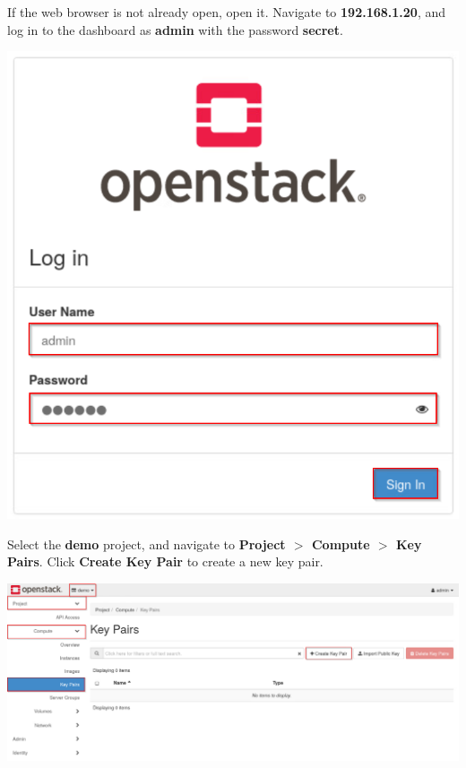 \documentclass[letterpaper, 12pt]{article}
\begin{document}
\begin{enumerate}
    \begin{labstep}
        If the web browser is not already open, open it.
        Navigate to \textbf{192.168.1.20}, and log in to the dashboard as \textbf{admin} with the password \textbf{secret}.

        \begin{center}
            \includegraphics[scale=0.5]{images/part3/step1.png}
        \end{center}
    \end{labstep}

    \begin{labstep}
        Select the \textbf{demo} project, and navigate to \textbf{Project $>$ Compute $>$ Key Pairs}.
        Click \textbf{Create Key Pair} to create a new key pair.

        \begin{center}
            \includegraphics[width=\linewidth]{images/part3/step2.png}
        \end{center}
    \end{labstep}


\end{enumerate}
\end{document}
